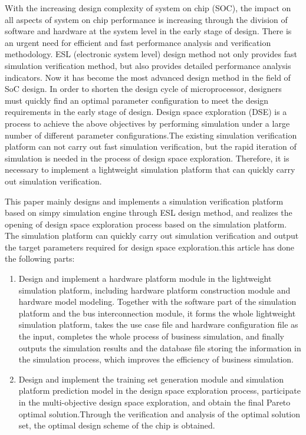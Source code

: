 \begin{abstract*}
  With the increasing design complexity of system on chip (SOC), the impact on all 
  aspects of system on chip performance is increasing through the division of 
  software and hardware at the system level in the early stage of design. There 
  is an urgent need for efficient and fast performance analysis and verification 
  methodology. ESL (electronic system level) design method not only provides 
  fast simulation verification method, but also provides detailed performance 
  analysis indicators. Now it has become the most advanced design method in 
  the field of SoC design. In order to shorten the design cycle of microprocessor, 
  designers must quickly find an optimal parameter configuration to meet the 
  design requirements in the early stage of design. Design space exploration (DSE) 
  is a process to achieve the above objectives by performing simulation under a 
  large number of different parameter configurations.The existing simulation 
  verification platform can not carry out fast simulation verification, 
  but the rapid iteration of simulation is needed in the process of design 
  space exploration. Therefore, it is necessary to implement a lightweight 
  simulation platform that can quickly carry out simulation verification.

  This paper mainly designs and implements a simulation verification platform based on simpy simulation engine through ESL design method, and realizes the opening of design space exploration process based on the simulation platform. The simulation platform can quickly carry out simulation verification and output the target parameters required for design space exploration.this article has done the following parts:

  \begin{enumerate}
    \item Design and implement a hardware platform module in the lightweight simulation platform, including hardware platform construction module and hardware model modeling. Together with the software part of the simulation platform and the bus interconnection module, it forms the whole lightweight simulation platform, takes the use case file and hardware configuration file as the input, completes the whole process of business simulation, and finally outputs the simulation results and the database file storing the information in the simulation process, which improves the efficiency of business simulation.
    \item Design and implement the training set generation module and simulation platform prediction model in the design space exploration process, participate in the multi-objective design space exploration, and obtain the final Pareto optimal solution.Through the verification and analysis of the optimal solution set, the optimal design scheme of the chip is obtained.
  \end{enumerate}


\end{abstract*}
